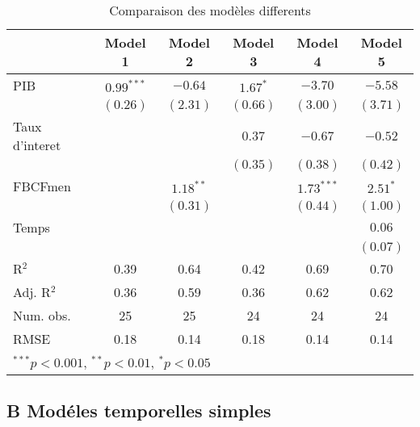 \documentclass[11pt,]{article}
\begin{document}
\begin{table}[!htbp]
\begin{center}
\begin{tabular}{l c c c c c }
\hline
 & Model 1 & Model 2 & Model 3 & Model 4 & Model 5 \\
\hline
PIB            & $0.99^{***}$ & $-0.64$     & $1.67^{*}$ & $-3.70$      & $-5.58$    \\
               & $(0.26)$     & $(2.31)$    & $(0.66)$   & $(3.00)$     & $(3.71)$   \\
Taux d'interet &              &             & $0.37$     & $-0.67$      & $-0.52$    \\
               &              &             & $(0.35)$   & $(0.38)$     & $(0.42)$   \\
FBCFmen        &              & $1.18^{**}$ &            & $1.73^{***}$ & $2.51^{*}$ \\
               &              & $(0.31)$    &            & $(0.44)$     & $(1.00)$   \\
Temps          &              &             &            &              & $0.06$     \\
               &              &             &            &              & $(0.07)$   \\
\hline
R$^2$          & 0.39         & 0.64        & 0.42       & 0.69         & 0.70       \\
Adj. R$^2$     & 0.36         & 0.59        & 0.36       & 0.62         & 0.62       \\
Num. obs.      & 25           & 25          & 24         & 24           & 24         \\
RMSE           & 0.18         & 0.14        & 0.18       & 0.14         & 0.14       \\
\hline
\multicolumn{6}{l}{\scriptsize{$^{***}p<0.001$, $^{**}p<0.01$, $^*p<0.05$}}
\end{tabular}
\caption{Comparaison des modèles differents}
\label{table:coefficients}
\end{center}
\end{table}

\FloatBarrier

\hypertarget{b-modeles-temporelles-simples}{%
\subsection{B Modéles temporelles
simples}\label{b-modeles-temporelles-simples}}

\FloatBarrier
\end{document}
